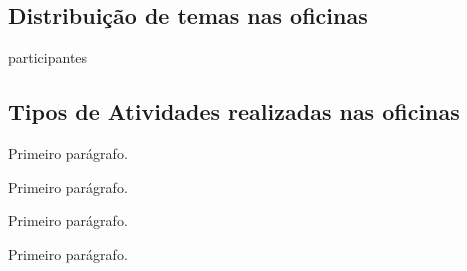 \documentclass[
12pt,		%
openright,	%
twoside,  %
a4paper,			%
chapter=TITLE,		%
english,			%
french,				%
spanish,			%
brazil				%
]{USPSC-classe/USPSC}
\begin{document}
\subsection[Distribui\c{c}\~ao de temas nas oficinas]{Distribui\c{c}\~ao de temas nas oficinas}\label{Distribui\c{c}\~ao de temas nas oficinas}
participantes

















\subsection[Tipos de Atividades realizadas nas oficinas]{Tipos de Atividades realizadas nas oficinas}\label{Tipos de Atividades realizadas nas oficinas}
Primeiro par\'agrafo.

















Primeiro par\'agrafo.

















Primeiro par\'agrafo.

















Primeiro par\'agrafo.
\end{document}
